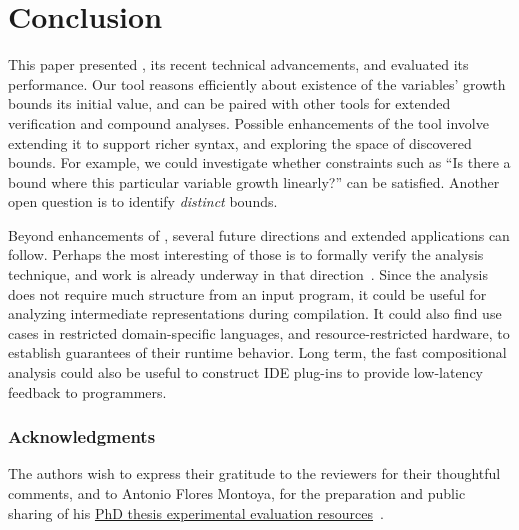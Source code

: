 \documentclass[runningheads]{llncs}
\begin{document}
\section{Conclusion}
\label{sec:conc}

This paper presented \pymwp, its recent technical advancements, and evaluated its performance.
Our tool reasons efficiently about existence of the variables' growth bounds \wrt its initial value, and can be paired with other tools for extended verification and compound analyses.
Possible enhancements of the tool involve extending it to support richer syntax, and exploring the space of discovered bounds.
For example, we could investigate whether constraints such as \enquote{Is there a bound where this particular variable growth linearly?} can be satisfied. 
Another open question is to identify \emph{distinct} bounds.

Beyond enhancements of \pymwp, several future directions and extended applications can follow.
Perhaps the most interesting of those is to formally verify the analysis technique, and work is already underway in that direction~\cite{aubert_coqpl}.
Since the analysis does not require much structure from an input program, it could be useful for analyzing intermediate representations during compilation.
It could also find use cases in restricted domain-specific languages, and resource-restricted hardware, to establish guarantees of their runtime behavior.
Long term, the fast compositional analysis could also be useful to construct IDE plug-ins to provide low-latency feedback to programmers.

\subsubsection{Acknowledgments} The authors wish to express their gratitude to the reviewers for their thoughtful comments, 
and to Antonio Flores Montoya, for the preparation and public sharing of his \href{http://aeflores.github.io/CoFloCo/experimentsPhD/}{PhD thesis experimental evaluation resources}~\cite{flores2017}.  



%
%



\clearpage
\appendix
\end{document}
